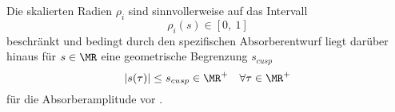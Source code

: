 Die skalierten Radien $\rho_i$ sind sinnvollerweise auf das Intervall 
\begin{equation}
	\rho_i(s) \in [0,\:1] 
	\label{eq:SkalierteRadiusImIntevall0bis1}
\end{equation}
beschränkt und bedingt durch den spezifischen Absorberentwurf liegt darüber hinaus für $s \in \MR$  
eine geometrische Begrenzung $s_{cusp}$
\begin{equation}
	\left|s(\tau)\right| \leq s_{cusp} \in \MR^+ \quad \forall \tau \in \MR^+  
	\label{eq:BeschraenkungAnSDurchScusp}
\end{equation}
für die Absorberamplitude vor \cite{Mayet:Tautochronic}.






